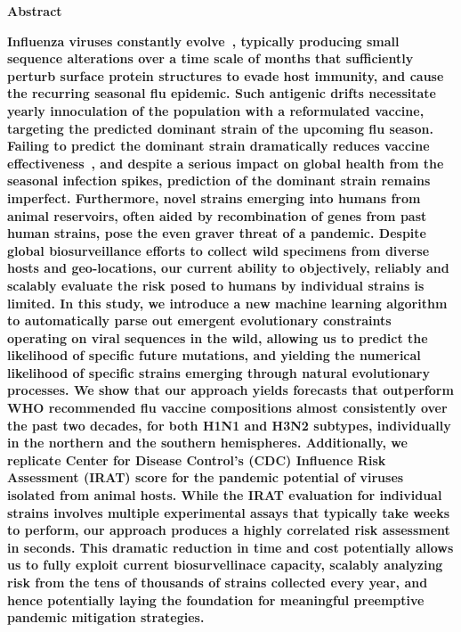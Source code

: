 \documentclass[onecolumn, compsoc,10pt]{IEEEtran}
\begin{document}
 
 
\maketitle

 
\begin{center}
    \textbf{Abstract}
\end{center}

  {\bf \sffamily \fontsize{10}{12}\selectfont \noindent   
Influenza viruses constantly evolve~\cite{dos2016influenza}, typically producing small sequence alterations over a time scale of months  that sufficiently perturb surface protein structures to evade host immunity, and cause the  recurring seasonal flu epidemic. Such antigenic drifts necessitate yearly innoculation of the population with a  reformulated  vaccine,  targeting the predicted dominant  strain of the upcoming flu season.  Failing to predict the dominant strain  dramatically reduces  vaccine effectiveness~\cite{tricco2013comparing}, and despite a serious  impact on global health from the seasonal infection spikes, prediction of the dominant strain remains imperfect. Furthermore, novel strains emerging into humans from animal reservoirs, often aided by  recombination of genes from past human  strains, pose the even graver threat of a  pandemic. Despite global biosurveillance efforts to  collect wild specimens from diverse hosts and geo-locations, our current ability to objectively, reliably and scalably  evaluate the risk posed to  humans by  individual strains  is limited. In this study, we introduce a new machine learning algorithm to automatically parse out emergent evolutionary constraints operating on viral sequences in the wild, allowing us to predict the likelihood of specific future  mutations, and  yielding the  numerical likelihood of specific  strains emerging through natural evolutionary processes. We show that our approach yields forecasts that outperform WHO recommended flu vaccine compositions almost consistently over the past two decades, for both H1N1 and H3N2 subtypes, individually in the northern and the southern hemispheres. Additionally, we replicate Center for Disease Control's (CDC) Influence Risk Assessment (IRAT) score for the pandemic potential of  \infl  viruses isolated from animal hosts. While the IRAT evaluation for individual strains involves multiple experimental assays that typically take weeks to perform, our approach produces a highly correlated risk assessment in seconds. This dramatic reduction in time and cost potentially allows us to fully exploit current biosurvellinace capacity, scalably analyzing risk from  the tens of thousands of strains collected every year, and hence potentially laying the foundation for  meaningful preemptive pandemic mitigation strategies. 
}
\end{document}
